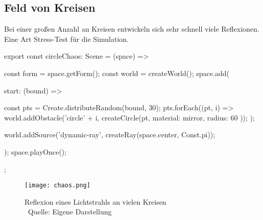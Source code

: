 \subsection*{Feld von Kreisen}
Bei einer großen Anzahl an Kreisen entwickeln sich sehr schnell viele Reflexionen. Eine Art Stress-Test für die Simulation.
\begin{verbnobox}[\scriptsize\mbox{}]
export const circleChaos: Scene = (space) => {
    const form = space.getForm();
    const world = createWorld();
    space.add({
        start: (bound) => {
            const pts = Create.distributeRandom(bound, 30);
            pts.forEach((pt, i) => {
                world.addObstacle('circle' + i, createCircle(pt, { material: mirror, radius: 60 }));
            });

            world.addSource('dynamic-ray', createRay(space.center, Const.pi));
        }
    });
    space.playOnce();
};
\end{verbnobox}

\begin{figure}
    \centering
    \texttt{[image: chaos.png]}

    \caption{Reflexion eines Lichtstrahls an vielen Kreisen \\ Quelle: Eigene Darstellung}

\end{figure}